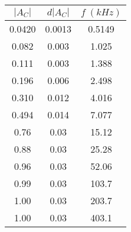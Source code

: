 \begin{tabular}{cc|c}
\toprule
$|A_{C}|$ & $d|A_{C}|$ & $f \; (kHz)$ \\
\midrule
 0.0420 & 0.0013 &   0.5149 \\
 0.082 &  0.003 &    1.025 \\
 0.111 &  0.003 &    1.388 \\
 0.196 &  0.006 &    2.498 \\
 0.310 &  0.012 &    4.016 \\
 0.494 &  0.014 &    7.077 \\
 0.76 &   0.03 &     15.12 \\
 0.88 &   0.03 &     25.28 \\
 0.96 &   0.03 &     52.06 \\
 0.99 &   0.03 &     103.7 \\
 1.00 &   0.03 &     203.7 \\
 1.00 &   0.03 &     403.1 \\
\bottomrule
\end{tabular}
